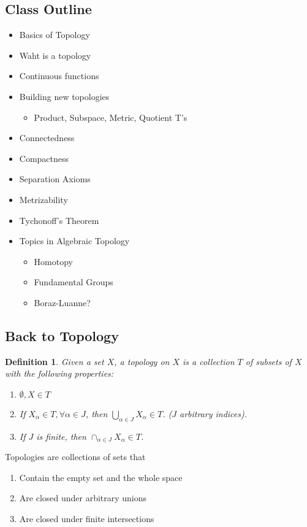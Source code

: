 \documentclass[11pt]{article}
\newtheorem{definition}{Definition}[section]
\begin{document}
\subsection{Class Outline}
\label{sec:orgf94402b}
\begin{itemize}
\item Basics of Topology
\item Waht is a topology
\item Continuous functions
\item Building new topologies
\begin{itemize}
\item Product, Subspace, Metric, Quotient T's
\end{itemize}
\item Connectedness
\item Compactness
\item Separation Axioms
\item Metrizability
\item Tychonoff's Theorem
\item Topics in Algebraic Topology
\begin{itemize}
\item Homotopy
\item Fundamental Groups
\item Boraz-Luanne?
\end{itemize}
\end{itemize}


\subsection{Back to Topology}
\label{sec:orgdf5e52d}
\begin{definition}


Given a set \(X\), a topology on \(X\) is a collection \(T\) of subsets of
\(X\) with the following properties:

\begin{enumerate}
\item \(\emptyset, X \in T\)
\item If \(X_{\alpha} \in T, \forall \alpha \in J\), then
\(\bigcup\limits_{\alpha \in J}X_{\alpha} \in T\). (\(J\) arbitrary
indices).
\item If \(J\) is finite, then \(\cap_{\alpha \in J}X_{\alpha} \in T\).
\end{enumerate}
\end{definition}

Topologies are collections of sets that 
\begin{enumerate}
\item Contain the empty set and the whole space
\item Are closed under arbitrary unions
\item Are closed under finite intersections
\end{enumerate}
\end{document}
